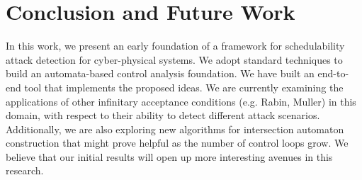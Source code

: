 \section{Conclusion and Future Work} \label{sec7}
\noindent
In this work, we present an early foundation of a framework for schedulability attack detection for cyber-physical systems.
We adopt standard techniques to build an automata-based control analysis foundation. We have built an end-to-end tool that
implements the proposed ideas.  We are currently examining the applications of other infinitary acceptance conditions
(e.g. Rabin, Muller) in this domain, with respect to their ability to detect different attack scenarios. Additionally, 
we are also exploring new algorithms for intersection automaton construction that might prove helpful as the number of
control loops grow. We believe that our initial results will open up more interesting avenues in this research.